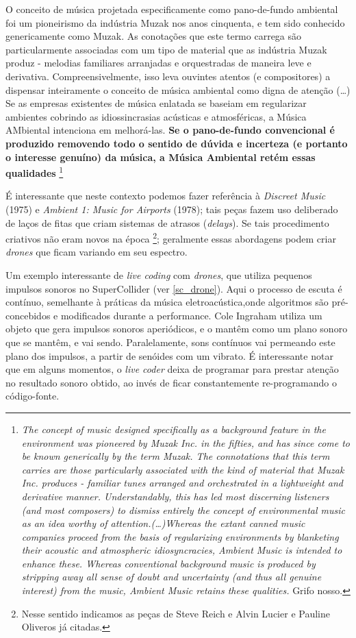 \begin{citacao}
O conceito de música projetada especificamente como pano-de-fundo ambiental foi um pioneirismo da indústria Muzak nos anos cinquenta, e tem sido conhecido genericamente como Muzak. As conotações que este termo carrega são particularmente associadas com um tipo de material que as indústria Muzak produz - melodias familiares arranjadas e orquestradas de maneira leve e derivativa. Compreensivelmente, isso leva ouvintes atentos (e compositores) a dispensar inteiramente o conceito de música ambiental como digna de atenção (\ldots) Se as empresas existentes de música enlatada se baseiam em regularizar ambientes cobrindo as idiossincrasias acústicas e atmosféricas, a Música AMbiental intenciona em melhorá-las. \textbf{Se o pano-de-fundo convencional é produzido removendo todo o sentido de dúvida e incerteza (e portanto o interesse genuíno) da música, a Música Ambiental retém essas qualidades} \cite[online]{eno_music_1978}
\footnote{\emph{The concept of music designed specifically as a background feature in the environment was pioneered by Muzak Inc. in the fifties, and has since come to be known generically by the term Muzak. The connotations that this term carries are those particularly associated with the kind of material that Muzak Inc. produces - familiar tunes arranged and orchestrated in a lightweight and derivative manner. Understandably, this has led most discerning listeners (and most composers) to dismiss entirely the concept of environmental music as an idea worthy of attention.(\ldots)Whereas the extant canned music companies proceed from the basis of regularizing environments by blanketing their acoustic and atmospheric idiosyncracies, Ambient Music is intended to enhance these. Whereas conventional background music is produced by stripping away all sense of doubt and uncertainty (and thus all genuine interest) from the music, Ambient Music retains these qualities.} Grifo nosso.}
\end{citacao} 

É interessante que neste contexto podemos fazer referência à \emph{Discreet Music} (1975) e \emph{Ambient 1: Music for Airports} (1978); tais peças fazem uso deliberado de laços de fitas que criam sistemas de atrasos (\emph{delays}). Se tais procedimento criativos não eram novos na época \footnote{Nesse sentido indicamos as peças de Steve Reich e Alvin Lucier e Pauline Oliveros já citadas.}; geralmente essas abordagens podem criar \emph{drones} que ficam variando em seu espectro.

Um exemplo interessante de \emph{live coding} com \emph{drones}, que utiliza pequenos impulsos sonoros no SuperCollider (ver \autoref{sc_drone}). Aqui o processo de escuta é contínuo, semelhante à práticas da música eletroacústica,onde algoritmos são pré-concebidos e modificados durante a performance.  Cole Ingraham utiliza um objeto que gera impulsos sonoros aperiódicos, e o mantêm como um plano sonoro que se mantêm, e vai sendo. Paralelamente, sons contínuos vai permeando este plano dos impulsos, a partir de senóides com um vibrato. É interessante notar que em alguns momentos, o \emph{live coder} deixa de programar para prestar atenção no resultado sonoro obtido, ao invés de ficar constantemente re-programando o código-fonte.

